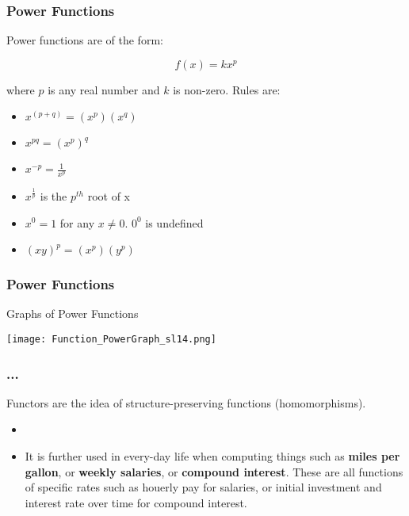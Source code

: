\documentclass{beamer}
\begin{document}
\begin{frame}[fragile]\frametitle{Power Functions}
\begin{center} Power functions are of the form: \end{center}

\begin{equation*}
  f(x) = kx^p
\end{equation*}
\begin{center} where $p$ is any real number and $k$ is non-zero. Rules are: \end{center}

\vfill
\begin{itemize}
  \item $x^{(p+q)} = (x^p)(x^q)$
  \item $x^{pq} = (x^p)^q$
  \item $x^{-p} = \frac{1}{x^p}$
  \item $x^{\frac{1}{p}}$ is the $p^{th}$ root of x
  \item $x^0 = 1$ for any $x \neq 0$. $0^0$ is undefined
  \item $(xy)^p = (x^p)(y^p)$
\end{itemize}

\end{frame}

\begin{frame}[fragile]\frametitle{Power Functions}
\begin{center}Graphs of Power Functions\end{center}

\begin{center}\texttt{[image: Function\_PowerGraph\_sl14.png]} \end{center}

\end{frame}

\begin{frame}[fragile]\frametitle{...}
\begin{center} Functors are the idea of structure-preserving functions (homomorphisms). \end{center}

\begin{itemize}
  \item 
  \item It is further used in every-day life when computing things such as \textbf{miles per gallon}, or \textbf{weekly salaries}, or \textbf{compound interest}. These are all functions of specific rates such as houerly pay for salaries, or initial investment and interest rate over time for compound interest.
\end{itemize}

\end{frame}
\end{document}
